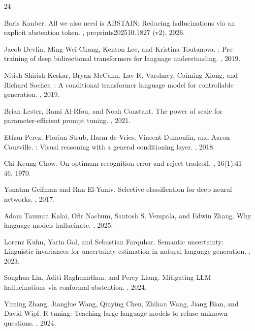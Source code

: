 \documentclass[11pt]{article}
\begin{document}
\begin{thebibliography}{24}

Baris Kanber.
\newblock All we also need is ABSTAIN: Reducing hallucinations via an explicit abstention token.
, preprints202510.1827 (v2), 2026.

Jacob Devlin, Ming-Wei Chang, Kenton Lee, and Kristina Toutanova.
: Pre-training of deep bidirectional transformers for language understanding.
, 2019.

Nitish Shirish Keskar, Bryan McCann, Lav R. Varshney, Caiming Xiong, and Richard Socher.
: A conditional transformer language model for controllable generation.
, 2019.

Brian Lester, Rami Al-Rfou, and Noah Constant.
\newblock The power of scale for parameter-efficient prompt tuning.
, 2021.

Ethan Perez, Florian Strub, Harm de Vries, Vincent Dumoulin, and Aaron Courville.
: Visual reasoning with a general conditioning layer.
, 2018.

Chi-Keung Chow.
\newblock On optimum recognition error and reject tradeoff.
, 16(1):41--46, 1970.

Yonatan Geifman and Ran El-Yaniv.
\newblock Selective classification for deep neural networks.
, 2017.

Adam Tauman Kalai, Ofir Nachum, Santosh S. Vempala, and Edwin Zhang.
\newblock Why language models hallucinate.
, 2025.

Lorenz Kuhn, Yarin Gal, and Sebastian Farquhar.
\newblock Semantic uncertainty: Linguistic invariances for uncertainty estimation in natural language generation.
, 2023.

Songhua Lin, Aditi Raghunathan, and Percy Liang.
\newblock Mitigating {LLM} hallucinations via conformal abstention.
, 2024.

Yiming Zhang, Jianglue Wang, Qinying Chen, Zhihan Wang, Jiang Bian, and David Wipf.
\newblock R-tuning: Teaching large language models to refuse unknown questions.
, 2024.


\end{thebibliography}
\end{document}
